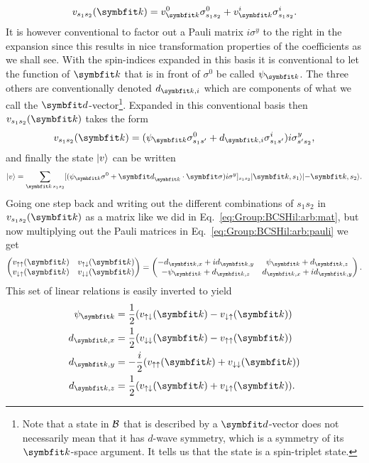 \begin{equation}
    \label{eq:GroupBCSHil:arb:pauliExp}
    v_{s_1s_2}(\v{k}) = v^0_\v{k}\sigma^0_{s_1s_2} + v^i_\v{k}\sigma^i_{s_1s_2}.
\end{equation}
It is however conventional to factor out a Pauli matrix $i\sigma^y$ to the right in the expansion since this results in nice transformation properties
of the coefficients as we shall see.
With the spin-indices expanded in this basis it is conventional to let the function of $\v{k}$
that is in front of $\sigma^0$ be called $\psi_\v{k}$. The three others are conventionally denoted $d_{\v{k},i}$ which are components of what we call
the $\v{d}$-vector\footnote{Note that a state in $\mathcal{B}$ that is described by a $\v{d}$-vector does not necessarily mean that it has $d$-wave symmetry,
which is a symmetry of its $\v{k}$-space argument. It tells us that the state is a spin-triplet state.}. Expanded in this conventional basis
then $v_{s_1s_2}(\v{k})$ takes the form
\begin{equation}
    \label{eq:Group:BCSHil:arb:pauli}
    v_{s_1s_2}(\v{k}) = (\psi_\v{k}\sigma^0_{s_1s'} + d_{\v{k},i}\sigma^i_{s_1s'})i\sigma^y_{s's_2},
\end{equation}
and finally the state $\lvert v \rangle$ can be written
\begin{equation}
    \label{eq:Group:BCSHil:arb:ket}
    \ket{v} = \sum_{\v{k}\,s_1s_2}[(\psi_\v{k}\sigma^0 + \v{d}_\v{k}\cdot\v{\sigma})i\sigma^y]_{s_1s_2}\ket{\v{k},s_1}\ket{-\v{k},s_2}.
\end{equation}
Going one step back and writing out the different combinations of $s_1s_2$ in $v_{s_1s_2}(\v{k})$ as a matrix like we did in
Eq.~\eqref{eq:Group:BCSHil:arb:mat}, but now multiplying out the Pauli matrices in Eq.~\eqref{eq:Group:BCSHil:arb:pauli} we get
\begin{equation}
    \label{eq:Group:BCSHil:arb:mat:Pauli}
    \begin{pmatrix}
        v_{\up\up}(\v{k}) & v_{\up\dn}(\v{k})\\
        v_{\dn\up}(\v{k}) & v_{\dn\dn}(\v{k})
    \end{pmatrix} =
    \begin{pmatrix}
        -d_{\v{k},x}+id_{\v{k},y} & \psi_\v{k}+d_{\v{k},z}\\
        -\psi_\v{k}+d_{\v{k},z} & d_{\v{k},x}+id_{\v{k},y}
    \end{pmatrix}.
\end{equation}
This set of linear relations is easily inverted to yield
\begin{align}
    \label{eq:Group:BCSHil:arb:inverseRel:psi}
    \psi_\v{k} &= \frac{1}{2}(v_{\up\dn}(\v{k}) - v_{\dn\up}(\v{k}))\\
    \label{eq:Group:BCSHil:arb:inverseRel:dx}
    d_{\v{k},x} &= \frac{1}{2}(v_{\dn\dn}(\v{k})-v_{\up\up}(\v{k}))\\
    \label{eq:Group:BCSHil:arb:inverseRel:dy}
    d_{\v{k},y} &= -\frac{i}{2}(v_{\up\up}(\v{k})+v_{\dn\dn}(\v{k}))\\
    \label{eq:Group:BCSHil:arb:inverseRel:dz}
    d_{\v{k},z} &= \frac{1}{2}(v_{\up\dn}(\v{k})+v_{\dn\up}(\v{k})).
\end{align}


